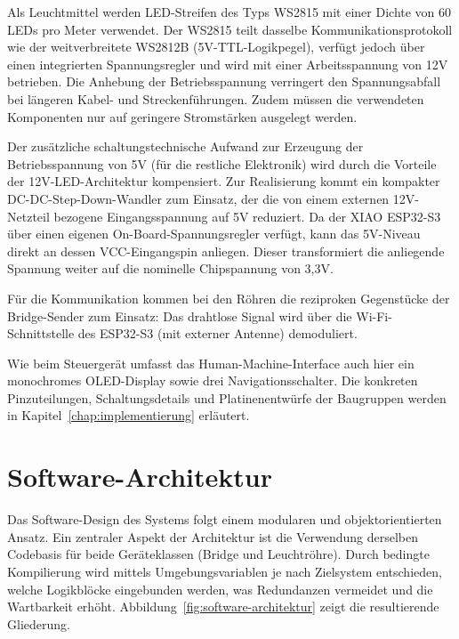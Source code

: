 Als Leuchtmittel werden LED-Streifen des Typs WS2815 mit einer Dichte von 60 LEDs pro Meter verwendet. 
Der WS2815 teilt dasselbe Kommunikationsprotokoll wie der weitverbreitete WS2812B (5V-TTL-Logikpegel), 
verfügt jedoch über einen integrierten Spannungsregler und wird mit einer Arbeitsspannung von 12V betrieben. 
Die Anhebung der Betriebsspannung verringert den Spannungsabfall bei längeren Kabel- und
Streckenführungen. Zudem müssen die verwendeten Komponenten nur auf geringere
Stromstärken ausgelegt werden.

Der zusätzliche schaltungstechnische Aufwand zur Erzeugung der Betriebsspannung von 5V (für die restliche Elektronik) wird 
durch die Vorteile der 12V-LED-Architektur kompensiert. 
Zur Realisierung kommt ein kompakter DC-DC-Step-Down-Wandler zum Einsatz, der die von einem externen 12V-Netzteil 
bezogene Eingangsspannung auf 5V reduziert. 
Da der XIAO ESP32-S3 über einen eigenen On-Board-Spannungsregler verfügt, kann das 5V-Niveau direkt 
an dessen VCC-Eingangspin anliegen. 
Dieser transformiert die anliegende Spannung weiter auf die nominelle Chipspannung von 3,3V.

Für die Kommunikation kommen bei den Röhren die reziproken Gegenstücke der Bridge-Sender zum Einsatz: 
Das drahtlose Signal wird über die Wi-Fi-Schnittstelle des ESP32-S3 (mit externer Antenne) demoduliert.

Wie beim Steuergerät umfasst das Human-Machine-Interface auch hier ein monochromes OLED-Display 
sowie drei Navigationsschalter. 
Die konkreten Pinzuteilungen, Schaltungsdetails und Platinenentwürfe der Baugruppen
werden in Kapitel~\ref{chap:implementierung} erläutert.

\section{Software-Architektur}
\label{sec:software-architektur}

Das Software-Design des Systems folgt einem modularen und objektorientierten Ansatz. 
Ein zentraler Aspekt der Architektur ist die Verwendung derselben Codebasis für beide 
Geräteklassen (Bridge und Leuchtröhre). Durch bedingte Kompilierung wird mittels Umgebungsvariablen je nach 
Zielsystem entschieden, welche Logikblöcke eingebunden werden, was Redundanzen vermeidet und 
die Wartbarkeit erhöht.
Abbildung~\ref{fig:software-architektur} zeigt die resultierende Gliederung.

